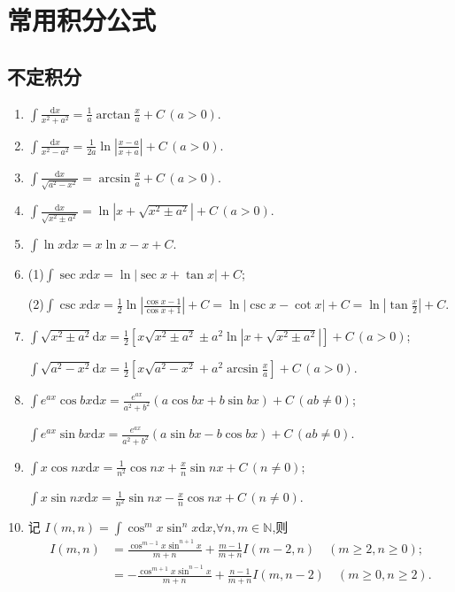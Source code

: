 \documentclass[../../main.tex]{subfiles}
\begin{document}
\section{常用积分公式}

\subsection{不定积分}

\begin{enumerate}
\item $\int\frac{\mathrm{d}x}{x^2+a^2}=\frac{1}{a}\arctan\frac{x}{a}+C\,(a>0)$.
\\
\item $\int\frac{\mathrm{d}x}{x^2-a^2}=\frac{1}{2a}\ln\left|\frac{x-a}{x+a}\right|+C\,(a>0)$.
\\
\item $\int\frac{\mathrm{d}x}{\sqrt{a^2-x^2}}=\arcsin\frac{x}{a}+C\,(a>0)$.
\\
\item $\int\frac{\mathrm{d}x}{\sqrt{x^2\pm a^2}}=\ln\left|x+\sqrt{x^2\pm a^2}\right|+C\,(a>0)$.
\\
\item $\int\ln x\mathrm{d}x=x\ln x-x+C$.
\\
\item (1)$\int\sec x\mathrm{d}x=\ln|\sec x+\tan x|+C$;

(2)$\int\csc x\mathrm{d}x=\frac{1}{2}\ln \left| \frac{\cos x-1}{\cos x+1} \right|+C=\ln|\csc x-\cot x|+C=\ln|\tan \frac{x}{2}| + C.$
\\
\item $\int\sqrt{x^2\pm a^2}\mathrm{d}x=\frac{1}{2}\left[x\sqrt{x^2\pm a^2}\pm a^2\ln\left|x+\sqrt{x^2\pm a^2}\right|\right]+C\,(a>0)$;

$\int\sqrt{a^2-x^2}\mathrm{d}x=\frac{1}{2}\left[x\sqrt{a^2-x^2}+a^2\arcsin\frac{x}{a}\right]+C\,(a>0)$.
\\
\item $\int e^{ax}\cos bx\mathrm{d}x=\frac{e^{ax}}{a^2+b^2}(a\cos bx+b\sin bx)+C\,(ab\neq0)$;

$\int e^{ax}\sin bx\mathrm{d}x=\frac{e^{ax}}{a^2+b^2}(a\sin bx-b\cos bx)+C\,(ab\neq0)$.
\\
\item $\int x\cos nx\mathrm{d}x=\frac{1}{n^2}\cos nx+\frac{x}{n}\sin nx+C\,(n\neq0)$;

$\int x\sin nx\mathrm{d}x=\frac{1}{n^2}\sin nx-\frac{x}{n}\cos nx+C\,(n\neq0)$.
\\
\item 记 $I(m,n)=\int\cos^m x\sin^n x\mathrm{d}x$,$\forall n,m\in\mathbb{N}$,则
\begin{align*}
I(m,n)&=\frac{\cos^{m-1}x\sin^{n+1}x}{m+n}+\frac{m-1}{m+n}I(m-2,n)\quad(m\geqslant 2,n\geqslant 0);\\
&=-\frac{\cos^{m+1}x\sin^{n-1}x}{m+n}+\frac{n-1}{m+n}I(m,n-2)\quad(m\geqslant 0,n\geqslant 2).
\end{align*}
\end{enumerate}
\end{document}
